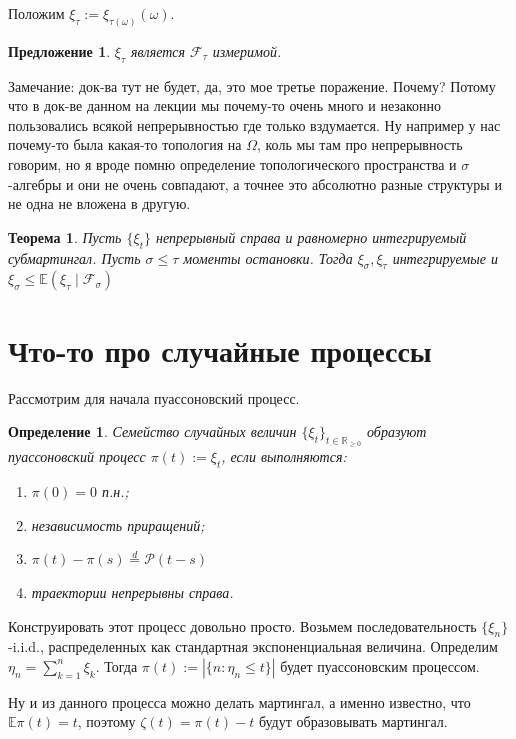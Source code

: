 \documentclass[12pt,a4paper]{article} %
\newtheorem{theorem}{Теорема}
\newtheorem{definition}{Определение}
\newtheorem{proposition}{Предложение}
\newcommand{\R}{\mathbb{R}}
\newcommand{\E}{\mathbb{E}}
\newcommand{\F}{\mathcal{F}}
\begin{document}
	Положим $\xi_{\tau}:=\xi_{\tau(\omega)}(\omega)$.
	\begin{proposition}
		$\xi_{\tau}$ является $\F_{\tau}$ измеримой.
	\end{proposition}
	Замечание: док-ва тут не будет, да, это мое третье поражение. Почему? Потому что в док-ве данном на лекции мы почему-то очень много и незаконно пользовались всякой непрерывностью где только вздумается. Ну например у нас почему-то была какая-то топология на $\Omega$, коль мы там про непрерывность говорим, но я вроде помню определение топологического пространства и $\sigma$-алгебры и они не очень совпадают, а точнее это абсолютно разные структуры и не одна не вложена в другую.
	\begin{theorem}
		Пусть $\{\xi_t\}$ непрерывный справа и равномерно интегрируемый субмартингал. Пусть $\sigma\leq\tau$ моменты остановки. Тогда $\xi_{\sigma},\xi_{\tau}$ интегрируемые и $\xi_{\sigma}\leq\E(\xi_{\tau}\mid\F_{\sigma})$
	\end{theorem}
	\section{Что-то про случайные процессы}
	Рассмотрим для начала пуассоновский процесс.
	\begin{definition}
		Семейство случайных величин $\{\xi_t\}_{t\in\R_{\geq0}}$ образуют пуассоновский процесс $\pi(t):=\xi_t$, если выполняются:
		\begin{enumerate}
			\item $\pi(0)=0$ п.н.;
			\item независимость приращений;
			\item $\pi(t)-\pi(s)\overset{d}{=}\mathcal{P}(t-s)$
			\item траектории непрерывны справа.
		\end{enumerate}
	\end{definition}
	Конструировать этот процесс довольно просто. Возьмем последовательность $\{\xi_n\}$-i.i.d., распределенных как стандартная экспоненциальная величина. Определим \\$\eta_n=\displaystyle\sum_{k=1}^n\xi_k$. Тогда $\pi(t):=|\{n:\eta_n\leq t\}|$ будет пуассоновским процессом.
	
	Ну и из данного процесса можно делать мартингал, а именно известно, что\\ $\E\pi(t)=t$, поэтому $\zeta(t)=\pi(t)-t$ будут образовывать мартингал.
	
\end{document}
